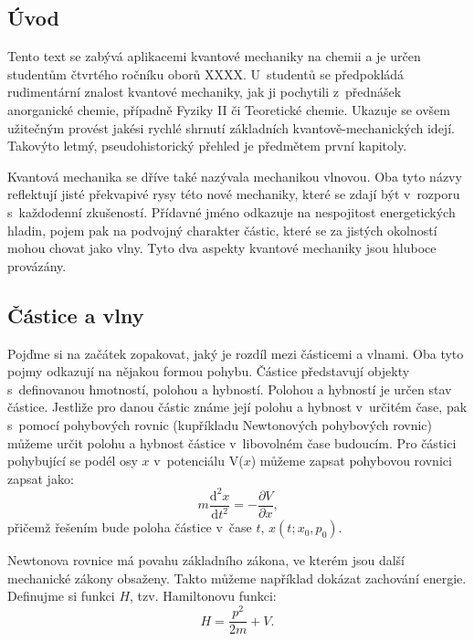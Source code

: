 \subsection{Úvod}
\newcommand{\dd}{\mathrm{d}}
Tento text se zabývá aplikacemi kvantové mechaniky na chemii a je určen studentům čtvrtého ročníku oborů XXXX. U~studentů se předpokládá rudimentární znalost kvantové mechaniky, jak ji pochytili z~přednášek anorganické chemie, případně Fyziky II či Teoretické chemie. Ukazuje se ovšem užitečným provést jakési rychlé shrnutí základních kvantově-mechanických idejí. Takovýto letmý, pseudohistorický přehled je předmětem první kapitoly. 

Kvantová mechanika se dříve také nazývala mechanikou vlnovou. Oba tyto názvy reflektují jisté překvapivé rysy této nové mechaniky, které se zdají být v~rozporu s~každodenní zkušeností. Přídavné jméno  odkazuje na nespojitost energetických hladin, pojem  pak na podvojný charakter částic, které se za jistých okolností mohou chovat jako vlny. Tyto dva aspekty kvantové mechaniky jsou hluboce provázány. 

\subsection{Částice a vlny}	
Pojďme si na začátek zopakovat, jaký je rozdíl mezi částicemi a vlnami. Oba tyto pojmy odkazují na nějakou formou pohybu. Částice představují objekty s~definovanou hmotností, polohou a hybností. Polohou a hybností je určen stav částice. Jestliže pro danou částic známe její polohu a hybnost v~určitém čase, pak s~pomocí pohybových rovnic (kupříkladu Newtonových pohybových rovnic) můžeme určit polohu a hybnost částice v~libovolném čase budoucím. Pro částici pohybující se podél osy $x$ v~potenciálu V($x$) můžeme zapsat pohybovou rovnici zapsat jako:
\begin{equation}
m \frac{\mathrm{d}^2 x}{\mathrm{d}t^2} = -\frac{\partial{V}}{\partial{x}}  \mbox{,}
\label{rov:Castice}
\end{equation}
přičemž řešením bude poloha částice v~čase $t$, $x(t; x_0,p_0)$.

Newtonova rovnice má povahu základního zákona, ve kterém jsou další mechanické zákony obsaženy. Takto můžeme například dokázat zachování energie. Definujme si funkci $H$, tzv. Hamiltonovu funkci:
\begin{equation}
H = \frac{p^2}{2m}+V\mbox{.}
\label{rov:hamiltonfce}
\end{equation}

